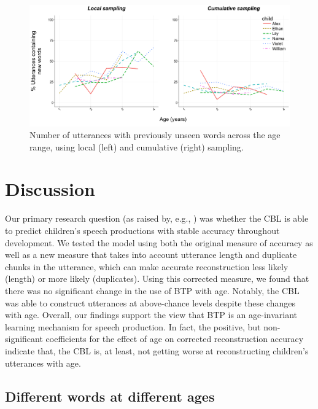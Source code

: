\documentclass{article}
\begin{document}
\begin{figure}
\centering
\includegraphics[width=\textwidth]{images/plotbothunknown.png} 
\caption{Number of utterances with previously unseen words across the age range, using local (left) and cumulative (right) sampling.}
\label{fig:plotbothunknown}
\end{figure}

\section{Discussion}

Our primary research question (as raised by, e.g., ) was whether the CBL is able to predict children's speech productions with stable accuracy throughout development. We tested the model using both the original measure of accuracy as well as a new measure that takes into account utterance length and duplicate chunks in the utterance, which can make accurate reconstruction less likely (length) or more likely (duplicates). Using this corrected measure, we found that there was no significant change in the use of BTP with age. Notably, the CBL was able to construct utterances at above-chance levels despite these changes with age. Overall, our findings support the view that BTP is an age-invariant learning mechanism for speech production. In fact, the positive, but non-significant coefficients for the effect of age on corrected reconstruction accuracy indicate that, the CBL is, at least, not getting worse at reconstructing children's utterances with age.

\subsection{Different words at different ages}
\end{document}
